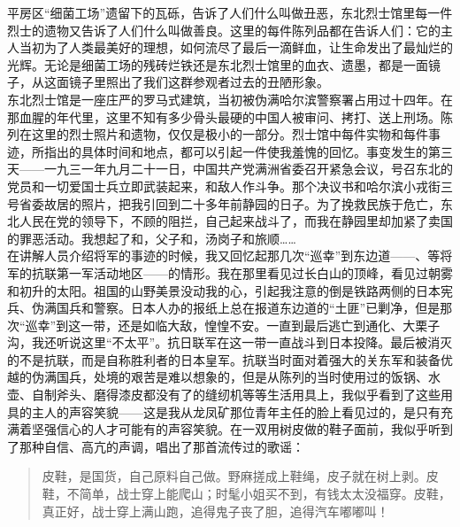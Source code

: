 平房区“细菌工场”遗留下的瓦砾，告诉了人们什么叫做丑恶，东北烈士馆里每一件烈士的遗物又告诉了人们什么叫做善良。这里的每件陈列品都在告诉人们：它的主人当初为了人类最美好的理想，如何流尽了最后一滴鲜血，让生命发出了最灿烂的光辉。无论是细菌工场的残砖烂铁还是东北烈士馆里的血衣、遗墨，都是一面镜子，从这面镜子里照出了我们这群参观者过去的丑陋形象。\\

东北烈士馆是一座庄严的罗马式建筑，当初被伪满哈尔滨警察署占用过十四年。在那血腥的年代里，这里不知有多少骨头最硬的中国人被审问、拷打、送上刑场。陈列在这里的烈士照片和遗物，仅仅是极小的一部分。烈士馆中每件实物和每件事迹，所指出的具体时间和地点，都可以引起一件使我羞愧的回忆。事变发生的第三天——一九三一年九月二十一日，中国共产党满洲省委召开紧急会议，号召东北的党员和一切爱国士兵立即武装起来，和敌人作斗争。那个决议书和哈尔滨小戎街三号省委故居的照片，把我引回到二十多年前静园的日子。为了挽救民族于危亡，东北人民在党的领导下，不顾的阻拦，自己起来战斗了，而我在静园里却加紧了卖国的罪恶活动。我想起了和，父子和，汤岗子和旅顺……\\

在讲解人员介绍将军的事迹的时候，我又回忆起那几次“巡幸”到东边道——、等将军的抗联第一军活动地区——的情形。我在那里看见过长白山的顶峰，看见过朝雾和初升的太阳。祖国的山野美景没动我的心，引起我注意的倒是铁路两侧的日本宪兵、伪满国兵和警察。日本人办的报纸上总在报道东边道的“土匪”已剿净，但是那次“巡幸”到这一带，还是如临大敌，惶惶不安。一直到最后逃亡到通化、大栗子沟，我还听说这里“不太平”。抗日联军在这一带一直战斗到日本投降。最后被消灭的不是抗联，而是自称胜利者的日本皇军。抗联当时面对着强大的关东军和装备优越的伪满国兵，处境的艰苦是难以想象的，但是从陈列的当时使用过的饭锅、水壶、自制斧头、磨得漆皮都没有了的缝纫机等等生活用具上，我似乎看到了这些用具的主人的声容笑貌——这是我从龙凤矿那位青年主任的脸上看见过的，是只有充满着坚强信心的人才可能有的声容笑貌。在一双用树皮做的鞋子面前，我似乎听到了那种自信、高亢的声调，唱出了那首流传过的歌谣：\\

\begin{quote}
	皮鞋，是国货，自己原料自己做。野麻搓成上鞋绳，皮子就在树上剥。皮鞋，不简单，战士穿上能爬山；时髦小姐买不到，有钱太太没福穿。皮鞋，真正好，战士穿上满山跑，追得鬼子丧了胆，追得汽车嘟嘟叫！\\
\end{quote}

